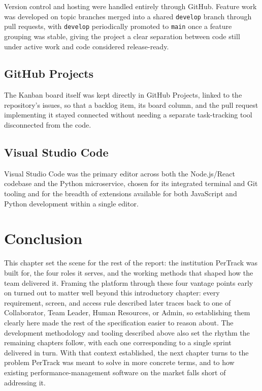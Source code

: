 \documentclass[12pt,a4paper]{report}
\begin{document}
Version control and hosting were handled entirely through GitHub. Feature work was developed on topic branches merged into a shared \texttt{develop} branch through pull requests, with \texttt{develop} periodically promoted to \texttt{main} once a feature grouping was stable, giving the project a clear separation between code still under active work and code considered release-ready.

\subsection{GitHub Projects}

The Kanban board itself was kept directly in GitHub Projects, linked to the repository's issues, so that a backlog item, its board column, and the pull request implementing it stayed connected without needing a separate task-tracking tool disconnected from the code.

\subsection{Visual Studio Code}

Visual Studio Code was the primary editor across both the Node.js/React codebase and the Python microservice, chosen for its integrated terminal and Git tooling and for the breadth of extensions available for both JavaScript and Python development within a single editor.

\section{Conclusion}

This chapter set the scene for the rest of the report: the institution PerTrack was built for, the four roles it serves, and the working methods that shaped how the team delivered it. Framing the platform through these four vantage points early on turned out to matter well beyond this introductory chapter: every requirement, screen, and access rule described later traces back to one of Collaborator, Team Leader, Human Resources, or Admin, so establishing them clearly here made the rest of the specification easier to reason about. The development methodology and tooling described above also set the rhythm the remaining chapters follow, with each one corresponding to a single sprint delivered in turn. With that context established, the next chapter turns to the problem PerTrack was meant to solve in more concrete terms, and to how existing performance-management software on the market falls short of addressing it.
\end{document}
